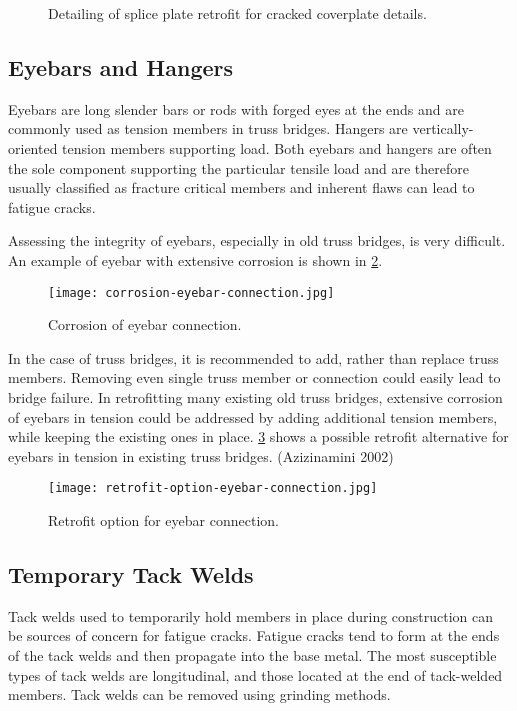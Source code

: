 \begin{figure}
  \caption{Detailing of splice plate retrofit for cracked coverplate details.}
  \label{fig:detail-splice-plate-retrofit-cracked-coverplate}
\end{figure}

\subsection{Eyebars and Hangers}
Eyebars are long slender bars or rods with forged eyes at the ends and are commonly used as tension members in
truss bridges. Hangers are vertically-oriented tension members supporting load. Both eyebars and hangers are often
the sole component supporting the particular tensile load and are therefore usually classified as fracture critical
members and inherent flaws can lead to fatigue cracks.

Assessing the integrity of eyebars, especially in old truss bridges, is very difficult. An example of eyebar with
extensive corrosion is shown in \cref{fig:corrosion-eyebar-connection}.

\begin{figure}
  \texttt{[image: corrosion-eyebar-connection.jpg]}
  \caption{Corrosion of eyebar connection.}
  \label{fig:corrosion-eyebar-connection}
\end{figure}

In the case of truss bridges, it is recommended to add, rather than replace truss members. Removing even single truss member or connection could easily lead to bridge failure. In retrofitting many existing old truss bridges, extensive corrosion of eyebars in tension could be addressed by adding additional tension members, while keeping the existing ones in place. \cref{fig:retrofit-option-eyebar-connection} shows a possible retrofit alternative for eyebars in tension in existing truss bridges. (Azizinamini 2002)

\begin{figure}
  \texttt{[image: retrofit-option-eyebar-connection.jpg]}
  \caption{Retrofit option for eyebar connection.}
  \label{fig:retrofit-option-eyebar-connection}
\end{figure}

\subsection{Temporary Tack Welds}
Tack welds used to temporarily hold members in place during construction can be sources of concern for fatigue cracks. Fatigue cracks tend to form at the ends of the tack welds and then propagate into the base metal. The most susceptible types of tack welds are longitudinal, and those located at the end of tack-welded members. Tack welds can be removed using grinding methods.


